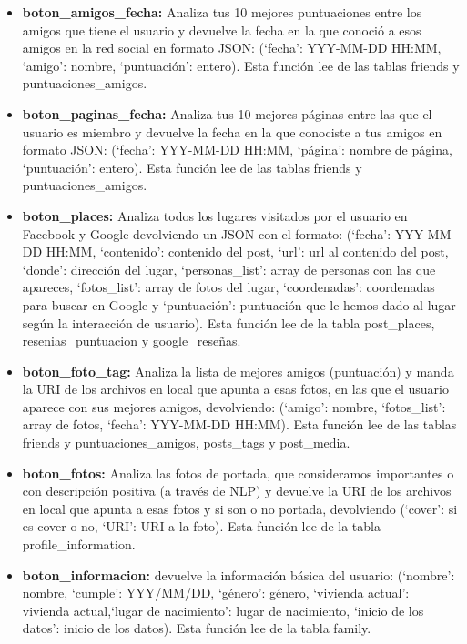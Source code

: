 \begin{itemize}
	\item \textbf{boton\_amigos\_fecha:} Analiza tus 10 mejores puntuaciones entre los amigos que tiene el usuario y devuelve la fecha en la que conoció a esos amigos en la red social en formato JSON: (`fecha': YYY-MM-DD HH:MM, `amigo': nombre, `puntuación': entero). Esta función lee de las tablas friends y puntuaciones\_amigos.
	
	\item \textbf{boton\_paginas\_fecha:} Analiza tus 10 mejores páginas entre las que el usuario es miembro y devuelve la fecha en la que conociste a tus amigos en formato JSON: (`fecha': YYY-MM-DD HH:MM, `página': nombre de página, `puntuación': entero). Esta función lee de las tablas friends y puntuaciones\_amigos.
	
	\item \textbf{boton\_places:} Analiza todos los lugares visitados por el usuario en Facebook y Google devolviendo un JSON con el formato: (`fecha': YYY-MM-DD HH:MM, `contenido': contenido del post, `url': url al contenido del post, `donde': dirección del lugar, `personas\_list': array de personas con las que apareces, `fotos\_list': array de fotos del lugar, `coordenadas': coordenadas para buscar en Google y `puntuación': puntuación que le hemos dado al lugar según la interacción de usuario). Esta función lee de la tabla post\_places, resenias\_puntuacion y google\_reseñas.
	
	\item \textbf{boton\_foto\_tag:} Analiza la lista de mejores amigos (puntuación) y manda la URI de los archivos en local que apunta a esas fotos, en las que el usuario aparece con sus mejores amigos, devolviendo: (`amigo': nombre, `fotos\_list': array de fotos, `fecha': YYY-MM-DD HH:MM). Esta función lee de las tablas friends y puntuaciones\_amigos, posts\_tags y post\_media.
	
	\item \textbf{boton\_fotos:} Analiza las fotos de portada, que consideramos importantes o con descripción positiva (a través de NLP) y devuelve la URI de los archivos en local que apunta a esas fotos y si son o no portada, devolviendo (`cover': si es cover o no, `URI': URI a la foto). Esta función lee de la tabla profile\_information.
	
	\item \textbf{boton\_informacion:} devuelve la información básica del usuario: (`nombre': nombre, `cumple': YYY/MM/DD, `género': género, `vivienda actual': vivienda actual,`lugar de nacimiento': lugar de nacimiento, `inicio de los datos': inicio de los datos). Esta función lee de la tabla family.
	

\end{itemize}
